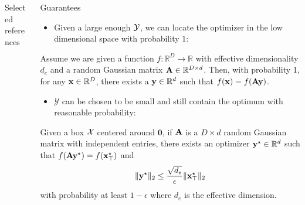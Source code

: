 \documentclass[final]{beamer}
\begin{document}
\begin{frame}[t]
\begin{columns}[T]
\begin{column}{.48\textwidth}
\begin{block}{Selected references}
 
  \vspace{-.8em}
  
\end{block}

\end{column}

\begin{column}{.48\textwidth}
\begin{block}{Guarantees}
\begin{itemize}
 \item Given a large enough $\cal Y$, we can locate the optimizer in the low dimensional space with probability $1$:
 
\end{itemize}
  \begin{theorem}
   \label{prop:1}
   Assume we are given a function $f: \mathbb{R}^{D} \rightarrow \mathbb{R}$ with effective dimensionality $d_e$ and a random Gaussian matrix $\mathbf{A} \in \mathbb{R}^{D\times d}$. Then, with probability 1, for any $\mathbf{x} \in \mathbb{R}^D$, there exists a $ \mathbf{y} \in \mathbb{R}^d$ such that $f(\mathbf{x}) = f(\mathbf{A}\mathbf{y})$.
  \end{theorem}

\begin{itemize}
 \item $\mathcal{Y}$ can be chosen to be small and still contain the optimum with reasonable probability:
\end{itemize}
 \begin{theorem}
   \label{prop:2}
   Given a box $\cal X$ centered around $\mathbf{0}$, if $\mathbf{A}$ is a $D\times d$ random Gaussian matrix 
   with independent entries,
   there exists an optimizer $\mathbf{y}^\star \in \mathbb{R}^{d}$ such that $f(\mathbf{A}\mathbf{y}^\star) = f(\mathbf{x}^\star_\top)$ and $$\|\mathbf{y}^\star\|_2 \leq \frac{\sqrt{d_e}}{\epsilon}\|\mathbf{x}^{\star}_\top\|_2$$ with probability at least $1-\epsilon$ where $d_e$ is
   the effective dimension.
 \end{theorem}
\end{block}


\end{column}
\end{columns}
\end{frame}
\end{document}
